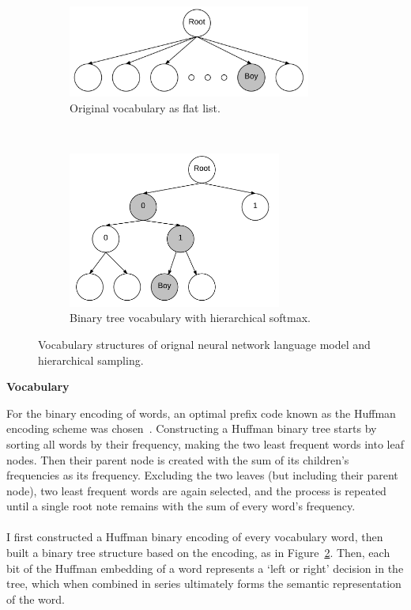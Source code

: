 \documentclass[a4paper,12pt,twoside,openright]{report}
\newcommand{\tb}{\vspace{10pt} \textbf}
\newcommand{\nl}{\\ \\}
\begin{document}
\begin{figure}
	\vspace{-20mm}
	\hspace{-10mm}
        \begin{subfigure}[b]{8cm}
                \includegraphics[width=8cm]{figs/chap4/original_nnlm.png}
		\captionsetup{justification=centering}
                \caption{Original vocabulary as flat list.\\ \color{white}{ here's the hid}}
                \label{fig:chap4:original_nnlm}
        \end{subfigure}%
        ~ %
        \begin{subfigure}[b]{7cm}
                \includegraphics[width=7cm]{figs/chap4/hierarchical.png}
                \captionsetup{justification=centering}
                \caption{Binary tree vocabulary with hierarchical softmax.}
                \label{fig:chap4:hierarchical}
        \end{subfigure}
	\captionsetup{justification=centering}
        \caption[Vocabulary structures.]{Vocabulary structures of orignal neural network language model and hierarchical sampling.}
        \label{fig:chap4:vocab}
\end{figure}        

\tb{Vocabulary}

For the binary encoding of words, an optimal prefix code known as the Huffman encoding scheme was chosen~\cite{huffman52}. Constructing a Huffman binary tree starts by sorting all words by their frequency, making the two least frequent words into leaf nodes. Then their parent node is created with the sum of its children's frequencies as its frequency. Excluding the two leaves (but including their parent node), two least frequent words are again selected, and the process is repeated until a single root note remains with the sum of every word's frequency. 
\nl
I first constructed a Huffman binary encoding of every vocabulary word, then built a binary tree structure based on the encoding, as in Figure~\ref{fig:chap4:hierarchical}. Then, each bit of the Huffman embedding of a word represents a `left or right' decision in the tree, which when combined in series ultimately forms the semantic representation of the word.
\end{document}
